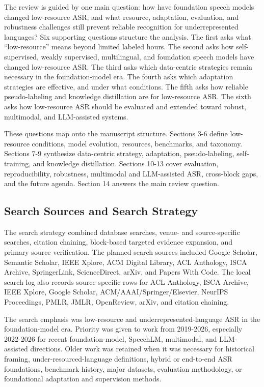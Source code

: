 \documentclass[pdflatex,sn-basic,iicol]{sn-jnl}
\theoremstyle{thmstyleone}
\theoremstyle{thmstyletwo}
\theoremstyle{thmstylethree}
\begin{document}
The review is guided by one main question: how have foundation speech models changed low-resource ASR, and what resource, adaptation, evaluation, and robustness challenges still prevent reliable recognition for underrepresented languages? Six supporting questions structure the analysis. The first asks what ``low-resource'' means beyond limited labeled hours. The second asks how self-supervised, weakly supervised, multilingual, and foundation speech models have changed low-resource ASR. The third asks which data-centric strategies remain necessary in the foundation-model era. The fourth asks which adaptation strategies are effective, and under what conditions. The fifth asks how reliable pseudo-labeling and knowledge distillation are for low-resource ASR. The sixth asks how low-resource ASR should be evaluated and extended toward robust, multimodal, and LLM-assisted systems.

These questions map onto the manuscript structure. Sections 3-6 define low-resource conditions, model evolution, resources, benchmarks, and taxonomy. Sections 7-9 synthesize data-centric strategy, adaptation, pseudo-labeling, self-training, and knowledge distillation. Sections 10-13 cover evaluation, reproducibility, robustness, multimodal and LLM-assisted ASR, cross-block gaps, and the future agenda. Section 14 answers the main review question.

\subsection{Search Sources and Search Strategy}

The search strategy combined database searches, venue- and source-specific searches, citation chaining, block-based targeted evidence expansion, and primary-source verification. The planned search sources included Google Scholar, Semantic Scholar, IEEE Xplore, ACM Digital Library, ACL Anthology, ISCA Archive, SpringerLink, ScienceDirect, arXiv, and Papers With Code. The local search log also records source-specific rows for ACL Anthology, ISCA Archive, IEEE Xplore, Google Scholar, ACM/AAAI/Springer/Elsevier, NeurIPS Proceedings, PMLR, JMLR, OpenReview, arXiv, and citation chaining.

The search emphasis was low-resource and underrepresented-language ASR in the foundation-model era. Priority was given to work from 2019-2026, especially 2022-2026 for recent foundation-model, SpeechLM, multimodal, and LLM-assisted directions. Older work was retained when it was necessary for historical framing, under-resourced-language definitions, hybrid or end-to-end ASR foundations, benchmark history, major datasets, evaluation methodology, or foundational adaptation and supervision methods.
\end{document}
